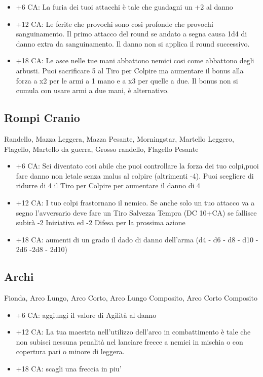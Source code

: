 \documentclass[a4paper,11pt,twoside,openany]{book}
\begin{document}
\begin{itemize}

\item +6 CA: La furia dei tuoi attacchi è tale che guadagni un +2 al danno

\item +12 CA: Le ferite che provochi sono cosi profonde che provochi sanguinamento. Il primo attacco del round se andato a segna causa 1d4 di danno extra da sanguinamento. Il danno non si applica il round successivo.

\item +18 CA: Le asce nelle tue mani abbattono nemici cosi come abbattono degli arbusti. Puoi sacrificare 5 al Tiro per Colpire ma aumentare il bonus alla forza a x2 per le armi a 1 mano e a x3 per quelle a due. Il bonus non si cumula con usare armi a due mani, è alternativo.

\end{itemize}

\subsection{Rompi Cranio} Randello, Mazza Leggera, Mazza Pesante, Morningstar,
Martello Leggero, Flagello, Martello da guerra, Grosso randello, Flagello
Pesante

\begin{itemize}
	\item +6 CA: Sei diventato cosi abile che puoi controllare la forza dei tuo colpi,puoi fare danno non letale senza malus al colpire (altrimenti -4). Puoi scegliere di ridurre di 4 il Tiro per Colpire per aumentare il danno di 4 
	
	\item +12 CA: I tuo colpi frastornano il nemico. Se anche solo un tuo attacco va a segno l'avversario deve fare un Tiro Salvezza Tempra (DC 10+CA) se fallisce subirà -2 Iniziativa ed -2 Difesa per la prossima azione 
	
	\item +18 CA: aumenti di un grado il dado di danno dell'arma (d4 - d6 - d8 - d10 - 2d6 -2d8 - 2d10)
\end{itemize}

\subsection{Archi} Fionda, Arco Lungo, Arco Corto, Arco Lungo Composito, Arco Corto Composito

\begin{itemize}

\item +6 CA: aggiungi il valore di Agilità al danno

\item +12 CA: La tua maestria nell'utilizzo dell'arco in combattimento è tale che non subisci nessuna penalità nel lanciare frecce a nemici in mischia o con copertura pari o minore di leggera.

\item +18 CA: scagli una freccia in piu'

\end{itemize}
\end{document}

